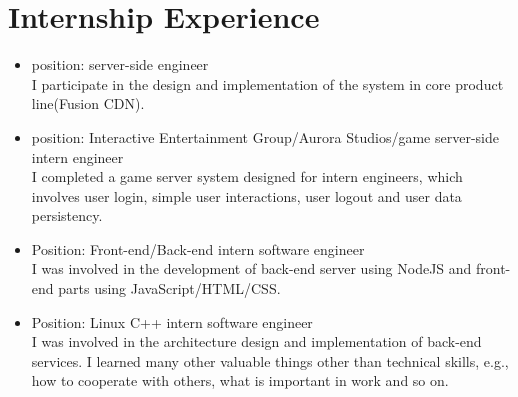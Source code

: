 \documentclass[11pt,a4paper]{moderncv}
\begin{document}


\section{Internship Experience}

{
\begin{itemize}
\item position: server-side engineer\\
I participate in the design and implementation of the system in core product line(Fusion CDN).
\end{itemize}
}

{
\begin{itemize}
\item position: Interactive Entertainment Group/Aurora Studios/game server-side intern engineer\\
    I completed a game server system designed for intern engineers, which involves user login, simple user interactions, user logout and user data persistency. 
\end{itemize}
}

{
\begin{itemize}
\item Position: Front-end/Back-end intern software engineer\\
I was involved in the development of back-end server using NodeJS and front-end parts using JavaScript/HTML/CSS.
\end{itemize}
}

{
\begin{itemize}
\item Position: Linux C++ intern software engineer\\
I was involved in the architecture design and implementation of back-end services. I learned many other valuable things other than technical skills, e.g., how to cooperate with others, what is important in work and so on.
\end{itemize}
}
\end{document}
